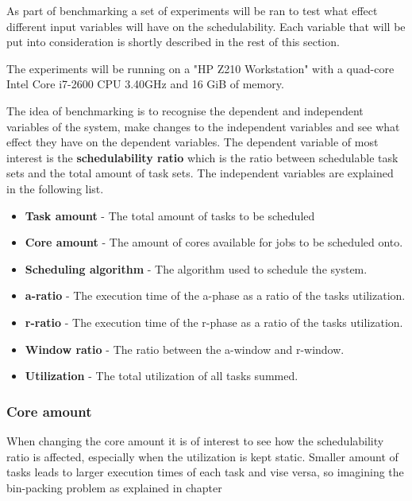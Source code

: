 \documentclass{kththesis}
\begin{document}
As part of benchmarking a set of experiments will be ran to test what effect different input
variables will have on the schedulability. Each variable that will be put into consideration is
shortly described in the rest of this section.

The experiments will be running on a "HP Z210 Workstation" with a quad-core Intel Core i7-2600 CPU
\@3.40GHz and 16 GiB of memory.

The idea of benchmarking is to recognise the dependent and independent variables of the system, make
changes to the independent variables and see what effect they have on the dependent variables. The
dependent variable of most interest is the \textbf{schedulability ratio} which is the ratio between
schedulable task sets and the total amount of task sets. The independent variables are explained in
the following list.

\begin{itemize}

    \item \textbf{Task amount} - The total amount of tasks to be scheduled
    \item \textbf{Core amount} - The amount of cores available for jobs to be scheduled onto.
    \item \textbf{Scheduling algorithm} - The algorithm used to schedule the system. 
    \item \textbf{\acrshort{a}-ratio} - The execution time of the \acrshort{a}-phase as a ratio of
        the tasks utilization.
    \item \textbf{\acrshort{r}-ratio} - The execution time of the \acrshort{r}-phase as a ratio of
        the tasks utilization.
    \item \textbf{Window ratio} - The ratio between the \acrshort{a}-window and \acrshort{r}-window.
    \item \textbf{Utilization} - The total utilization of all tasks summed.

\end{itemize}


\subsubsection{Core amount}

When changing the core amount it is of interest to see how the schedulability ratio is affected,
especially when the utilization is kept static. Smaller amount of tasks leads to larger execution
times of each task and vise versa, so imagining the bin-packing problem as explained in chapter
\end{document}
